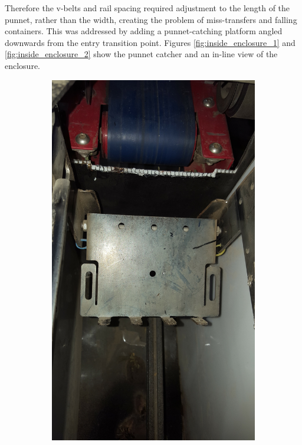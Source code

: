 \documentclass[fleqn,twoside,12pt]{report}
\begin{document}
Therefore the v-belts and rail spacing required adjustment to the length of the punnet, rather than the width, creating the problem of miss-transfers and falling containers. This was addressed by adding a punnet-catching platform angled downwards from the entry transition point. Figures \ref{fig:inside_enclosure_1} and \ref{fig:inside_enclosure_2} show the punnet catcher and an in-line view of the enclosure.


\begin{figure}[ht]
	\centering
	\begin{subfigure}{.5\textwidth}
		\centering
		\includegraphics[width=\linewidth, angle=270]{inside_enclosure_1.jpg}

\end{subfigure}
\end{figure}
\end{document}
